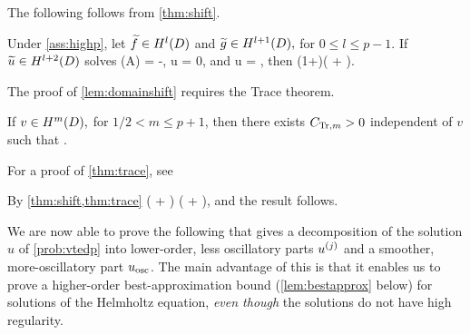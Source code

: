 

The following  follows from \cref{thm:shift}.

\bco\label{lem:domainshift}
Under \cref{ass:highp}, let $\ftilde \in \HlD$ and $\gtilde \in \HlpoD,$ for $0 \leq l \leq p-1$. If $\utilde \in \HlptD$ solves
\beqs
\grad \cdot \mleft(A\grad \utilde\mright) = -\ftilde,
\eeqs
\beqs \trGD u = 0,
\eeqs
and
\beqs
\dn u = \trGI \gtilde,
\eeqs
then
\beqs
\NHlptD{\utilde} \leq \CAl\mleft(1+\CTrlpo\mright)\mleft(\NHlD{\ftilde} + \NHlpoD{\trGI \gtilde}\mright).
\eeqs
\eco

The proof of \cref{lem:domainshift} requires the Trace theorem.

\label{thm:trace}
If $v \in \HmD,$ for $1/2 < m \leq p+1$, then there exists $C_{\mathrm{Tr},m} > 0$ independent of $v$ such that
\beqs
{} \leq \CTrm {}.
\eeqs
\enth

For a proof of \cref{thm:trace}, see \cite[Theorem 3.37]{Mc:00}

By \cref{thm:shift,thm:trace}
\beqs
\NHlptD{\utilde} \leq \CAl \mleft(\NHlD{\ftilde} + \NHlphGI{\gtilde}\mright) \leq \CAl \mleft(\NHlD{\ftilde} + \NHlpoD{\gtilde}\mright),
\eeqs
and the result follows.
\epf

We are now able to prove the following  that gives a decomposition of the solution $u$ of \cref{prob:vtedp} into lower-order, less oscillatory parts $u^{(j)}$ and a smoother, more-oscillatory part $u_{\mathrm{osc}}$. The main advantage of this  is that it enables us to prove a higher-order best-approximation bound (\cref{lem:bestapprox} below) for solutions of the Helmholtz equation, \emph{even though} the solutions do not have high regularity.

